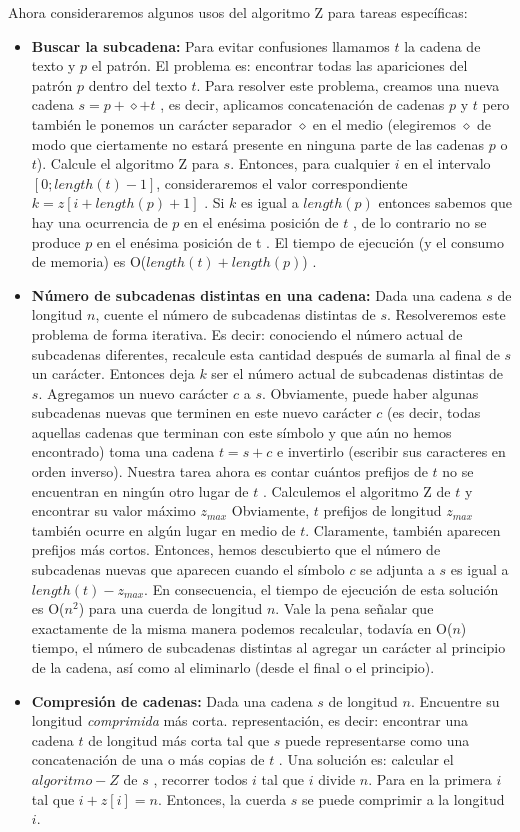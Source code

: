 Ahora consideraremos algunos usos del algoritmo Z para tareas específicas:

\begin{itemize}
	\item \textbf{Buscar la subcadena:} Para evitar confusiones llamamos $t$ la cadena de texto y $p$ el patrón. El problema es: encontrar todas las apariciones del patrón $p$ dentro del texto $t$.
	Para resolver este problema, creamos una nueva cadena $s = p + \diamond + t$ , es decir, aplicamos concatenación de cadenas  $p$ y $t$ pero también le
	ponemos un carácter separador $\diamond$ en el medio (elegiremos $\diamond$ de modo que ciertamente no estará presente en ninguna parte de las cadenas $p$ o $t$). Calcule el algoritmo Z para $s$. Entonces, para cualquier $i$ en el intervalo $[0; length(t)-1]$, consideraremos el valor correspondiente
	$k = z[i + length(p) + 1]$ . Si $k$ es igual a $length(p)$ entonces sabemos que hay una ocurrencia de $p$ en el enésima posición de $t$ , de lo contrario no se produce $p$ en el enésima posición de t .
	El tiempo de ejecución (y el consumo de memoria) es O($length(t) + length(p)$) .
	
	\item \textbf{Número de subcadenas distintas en una cadena:} Dada una cadena $s$ de longitud $n$, cuente el número de subcadenas distintas de $s$.
	Resolveremos este problema de forma iterativa. Es decir: conociendo el número actual de subcadenas diferentes, recalcule esta cantidad después de
	sumarla al final de $s$ un carácter. Entonces deja $k$ ser el número actual de subcadenas distintas de $s$. Agregamos un nuevo carácter $c$ a $s$. Obviamente, puede haber algunas subcadenas nuevas que terminen en este nuevo carácter $c$ (es decir, todas aquellas cadenas que terminan con este símbolo y que aún no hemos encontrado) toma una cadena $t = s + c$ e invertirlo (escribir sus caracteres en orden inverso). Nuestra tarea ahora es contar cuántos prefijos de $t$ no se encuentran en ningún otro lugar de $t$ . Calculemos el algoritmo Z de $t$ y encontrar su valor máximo $z_{max}$  Obviamente, $t$ prefijos de longitud $z_{max}$ también ocurre en algún lugar en medio de $t$. Claramente, también aparecen prefijos más cortos.
	Entonces, hemos descubierto que el número de subcadenas nuevas que aparecen cuando el símbolo $c$ se adjunta a $s$ es igual a $length(t)-z_{max}$.
	En consecuencia, el tiempo de ejecución de esta solución es O($n^2$) para una cuerda de longitud $n$. Vale la pena señalar que exactamente de la misma manera podemos recalcular, todavía en O($n$) tiempo, el número de subcadenas distintas al agregar un carácter al principio de la cadena, así como al eliminarlo (desde el final o el principio).
	
	\item \textbf{Compresión de cadenas:} Dada una cadena $s$ de longitud $n$. Encuentre su longitud \emph{comprimida} más corta. representación, es decir: encontrar una cadena $t$ de longitud más corta tal que $s$ puede representarse como una concatenación de una o más copias de $t$ .
	Una solución es: calcular el $algoritmo-Z$ de $s$ , recorrer todos $i$ tal que $i$ divide $n$. Para en la primera $i$ tal que $i + z[i] = n$. Entonces, la cuerda $s$ se puede comprimir a la longitud $i$.
\end{itemize}